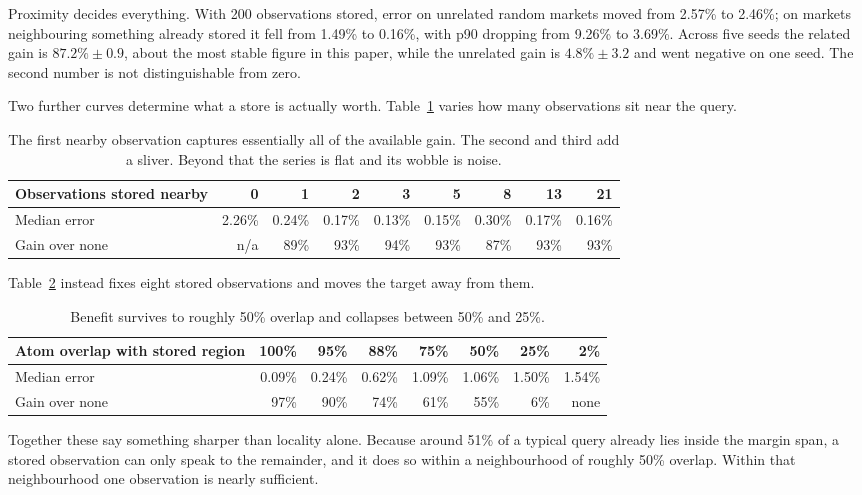 \documentclass[11pt]{article}
\begin{document}
Proximity decides everything. With 200 observations stored, error on unrelated
random markets moved from 2.57\% to 2.46\%; on markets neighbouring something
already stored it fell from 1.49\% to 0.16\%, with p90 dropping from 9.26\% to
3.69\%. Across five seeds the related gain is $87.2\% \pm 0.9$, about the most
stable figure in this paper, while the unrelated gain is $4.8\% \pm 3.2$ and went
negative on one seed. The second number is not distinguishable from zero.

Two further curves determine what a store is actually worth.
Table~\ref{tab:sat} varies how many observations sit near the query.

\begin{table}[h]
\centering
\begin{tabular}{lrrrrrrrr}
\toprule
Observations stored nearby & 0 & 1 & 2 & 3 & 5 & 8 & 13 & 21 \\
\midrule
Median error & 2.26\% & 0.24\% & 0.17\% & 0.13\% & 0.15\% & 0.30\% & 0.17\% & 0.16\% \\
Gain over none & n/a & 89\% & 93\% & 94\% & 93\% & 87\% & 93\% & 93\% \\
\bottomrule
\end{tabular}
\caption{The first nearby observation captures essentially all of the available
gain. The second and third add a sliver. Beyond that the series is flat and its
wobble is noise.}
\label{tab:sat}
\end{table}

Table~\ref{tab:decay} instead fixes eight stored observations and moves the
target away from them.

\begin{table}[h]
\centering
\begin{tabular}{lrrrrrrr}
\toprule
Atom overlap with stored region & 100\% & 95\% & 88\% & 75\% & 50\% & 25\% & 2\% \\
\midrule
Median error   & 0.09\% & 0.24\% & 0.62\% & 1.09\% & 1.06\% & 1.50\% & 1.54\% \\
Gain over none & 97\%   & 90\%   & 74\%   & 61\%   & 55\%   & 6\%    & none \\
\bottomrule
\end{tabular}
\caption{Benefit survives to roughly 50\% overlap and collapses between 50\% and
25\%.}
\label{tab:decay}
\end{table}

Together these say something sharper than locality alone. Because around 51\% of
a typical query already lies inside the margin span, a stored observation can
only speak to the remainder, and it does so within a neighbourhood of roughly
50\% overlap. Within that neighbourhood one observation is nearly sufficient.
\end{document}
